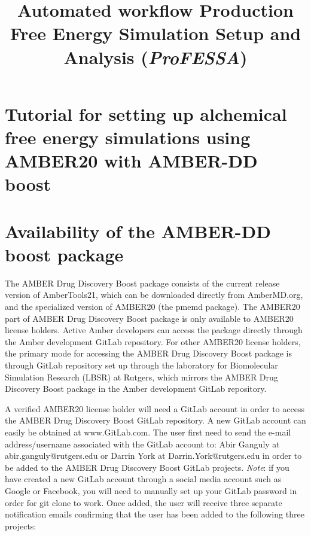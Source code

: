 \documentclass[11pt,letterpaper,titlepage]{article}
\title
{\bf Automated workflow Production Free Energy Simulation Setup and Analysis (\textit{ProFESSA})}
\begin{document}
\maketitle

\section*{Tutorial for setting up alchemical free energy simulations using AMBER20 with AMBER-DD boost}
\vspace{1cm}

\section {Availability of the AMBER-DD boost package}

The AMBER Drug Discovery Boost package consists of the current release version of
AmberTools21, which can be downloaded directly from AmberMD.org, and the specialized
version of AMBER20 (the pmemd package). The AMBER20 part of AMBER Drug Discovery
Boost package is only available to AMBER20 license holders.  Active Amber developers can
access the package  directly through the Amber development GitLab repository.  For other
AMBER20 license holders, the primary mode for accessing the AMBER Drug Discovery Boost
package is through GitLab repository set up through the laboratory for Biomolecular
Simulation Research (LBSR) at Rutgers, which mirrors the AMBER Drug Discovery Boost
package in the Amber development GitLab repository.

A verified AMBER20 license holder will need a GitLab account in order to access the
AMBER Drug Discovery Boost GitLab repository. A new GitLab
account can easily be obtained at www.GitLab.com.  The user first need to send the
e-mail address/username associated with the GitLab account to: Abir Ganguly at
abir.ganguly@rutgers.edu or Darrin York at Darrin.York@rutgers.edu in order to be added to
the AMBER Drug Discovery Boost  GitLab projects.
\textit{Note}: if you have created a new GitLab account through a social media account
such as Google or Facebook, you will need to manually set up your GitLab password in order
for git clone to work. Once added, the user will receive three separate notification
emails confirming that the user has been added to the following three projects:\\

\end{document}
